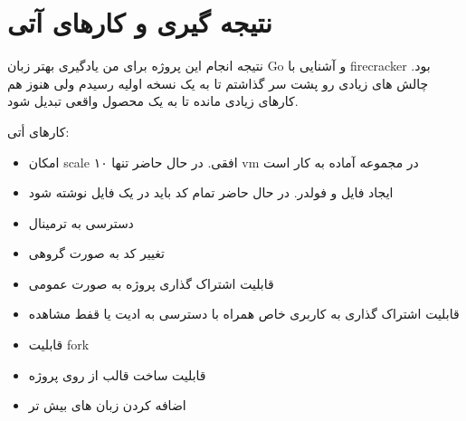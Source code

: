\chapter{نتیجه گیری و کارهای آتی}

نتیجه انجام این پروژه برای من یادگیری بهتر زبان Go و آشنایی با firecracker بود.
چالش های زیادی رو پشت سر گذاشتم تا به یک نسخه اولیه رسیدم ولی هنوز هم کارهای زیادی مانده تا به یک محصول واقعی تبدیل شود.


کارهای أتی:
\begin{itemize}
    \item امکان scale افقی. در حال حاضر تنها ۱۰ vm در مجموعه آماده به کار است
    \item ایجاد فایل و فولدر. در حال حاضر تمام کد باید در یک فایل نوشته شود
    \item دسترسی به ترمینال
    \item تغییر کد به صورت گروهی
    \item قابلیت اشتراک گذاری پروژه به صورت عمومی
    \item قابلیت اشتراک گذاری به کاربری خاص همراه با دسترسی به ادیت یا قفط مشاهده
    \item قابلیت fork
    \item قابلیت ساخت قالب از روی پروژه
    \item اضافه کردن زبان های بیش تر
\end{itemize}